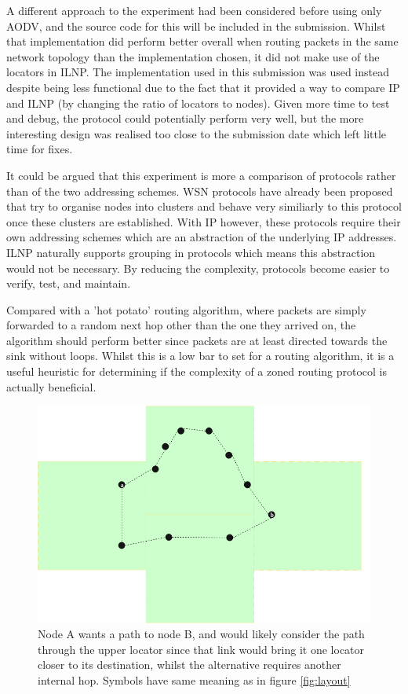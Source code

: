 \documentclass[12pt]{article}
\begin{document}
A different approach to the experiment had been considered before using only AODV, and the source code for this will be included in the submission. Whilst that implementation did perform better overall when routing packets in the same network topology than the implementation chosen, it did not make use of the locators in ILNP. The implementation used in this submission was used instead despite being less functional due to the fact that it provided a way to compare IP and ILNP (by changing the ratio of locators to nodes). Given more time to test and debug, the protocol could potentially perform very well, but the more interesting design was realised too close to the submission date which left little time for fixes. 

It could be argued that this experiment is more a comparison of protocols rather than of the two addressing schemes. WSN protocols have already been proposed that try to organise nodes into clusters and behave very similiarly to this protocol once these clusters are established. With IP however, these protocols require their own addressing schemes which are an abstraction of the underlying IP addresses. ILNP naturally supports grouping in protocols which means this abstraction would not be necessary. By reducing the complexity, protocols become easier to verify, test, and maintain. 

Compared with a 'hot potato' routing algorithm, where packets are simply forwarded to a random next hop other than the one they arrived on, the algorithm should perform better since packets are at least directed towards the sink without loops. Whilst this is a low bar to set for a routing algorithm, it is a useful heuristic for determining if the complexity of a zoned routing protocol is actually beneficial.

\begin{figure}[!ht]
	\centering
	\includegraphics[width=\textwidth]{images/bad} 
	\caption{Node A wants a path to node B, and would likely consider the path through the upper locator since that link would bring it one locator closer to its destination, whilst the alternative requires another internal hop. Symbols have same meaning as in figure \ref{fig:layout}}
	\label{fig:bad}
\end{figure}
\end{document}
